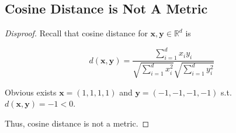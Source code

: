 \documentclass{article}
\newenvironment{disproof}{\begin{proof}[\noindent\it Disproof]}{\end{proof}}
\newcommand{\bd}[1]{\boldsymbol{#1}}
\begin{document}
\vspace{1em}
\subsection{Cosine Distance is Not A Metric}
\vspace{1em}
\begin{disproof}
    Recall that cosine distance for $\bd{x},\bd{y}\in\mathbb{R}^d$ is

    \vspace{-0.75em}
    $$d(\bd{x},\bd{y}) = \frac{\sum_{i=1}^dx_iy_i}{\sqrt{\sum_{i=1}^dx_i^2}\sqrt{\sum_{i=1}^dy_i^2}}$$

    \hspace{2.6em}
    Obvious exists $\bd{x}=(1,1,1,1)$ and $\bd{y}=(-1,-1,-1,-1)$ s.t. $d(\bd{x},\bd{y})=-1<0$.

    \hspace{2.6em}
    Thus, cosine distance is not a metric.
\end{disproof}

\vspace{1em}
\end{document}
